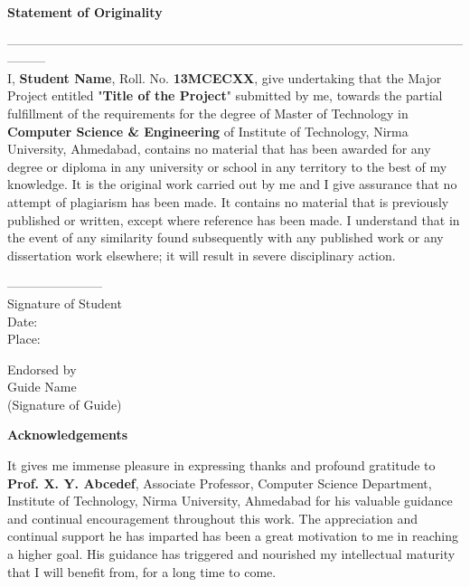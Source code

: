\newpage
\vspace{4cm}
\begin{center}
{\Large \bf Statement of Originality}\\
\end{center}
\vspace{-0.6cm}
---------------------------------------------------------------------------------------------------------------------\\
\noindent I, \textbf{Student Name}, Roll. No. \textbf{13MCECXX}, give undertaking that the Major Project entitled "\textbf{Title of the Project}" submitted by me, towards the partial fulfillment of the requirements for the degree of Master of Technology in \textbf{Computer Science \& Engineering} of Institute of Technology, Nirma University, Ahmedabad, contains no material that has been awarded for any degree or diploma in any university or school in any territory to the best of my knowledge. It is the original work carried out by me and I give assurance that no attempt of plagiarism has been made. It contains no material that is previously published or written, except where reference has been made. I understand that in the event of any similarity found subsequently with any published work or any dissertation work elsewhere; it will result in severe disciplinary action.



\vspace{2cm}
-----------------------\\
Signature of Student\\
Date:\\
Place:\\
\begin{flushright}
Endorsed by \\
Guide Name \\
(Signature of Guide)
\end{flushright}



\newpage
{}
\begin{center}
{\Large \bf Acknowledgements}\\
\end{center}
\vspace{10pt}
It gives me immense pleasure in expressing thanks and profound gratitude to \textbf{Prof. X. Y. Abcedef}, Associate Professor, Computer Science Department, Institute of Technology, Nirma University, Ahmedabad for his valuable guidance and continual encouragement throughout this work. The appreciation and continual support he has imparted has been a great motivation to me in reaching a higher goal. His guidance has triggered and nourished my intellectual maturity that I will benefit from, for a long time to come.\\

